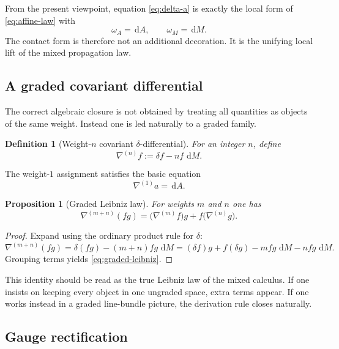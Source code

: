 \documentclass[11pt]{article}
\newtheorem{definition}{Definition}
\newtheorem{proposition}{Proposition}
\newcommand{\dd}{\,\mathrm{d}}
\newcommand{\del}{\delta}
\newcommand{\nab}{\nabla}
\begin{document}
From the present viewpoint, equation \eqref{eq:delta-a} is exactly the local form of \eqref{eq:affine-law} with
\[
\omega_A=\dd A,
\qquad
\omega_M=\dd M.
\]
The contact form is therefore not an additional decoration. It is the unifying local lift of the mixed propagation law.

\subsection{A graded covariant differential}

The correct algebraic closure is not obtained by treating all quantities as objects of the same weight. Instead one is led naturally to a graded family.

\begin{definition}[Weight-$n$ covariant $\delta$-differential]
For an integer $n$, define
\begin{equation}
\label{eq:nabla-n}
\nab^{(n)}f:=\del f-nf\,\dd M.
\end{equation}
\end{definition}

The weight-$1$ assignment satisfies the basic equation
\begin{equation}
\label{eq:weight-one}
\nab^{(1)}a=\dd A.
\end{equation}

\begin{proposition}[Graded Leibniz law]
\label{prop:graded-leibniz}
For weights $m$ and $n$ one has
\begin{equation}
\label{eq:graded-leibniz}
\nab^{(m+n)}(fg)=\bigl(\nab^{(m)}f\bigr)g+f\bigl(\nab^{(n)}g\bigr).
\end{equation}
\end{proposition}

\begin{proof}
Expand using the ordinary product rule for $\del$:
\[
\nab^{(m+n)}(fg)
=\del(fg)-(m+n)fg\,\dd M
=(\del f)g+f(\del g)-mfg\,\dd M-nfg\,\dd M.
\]
Grouping terms yields \eqref{eq:graded-leibniz}.
\end{proof}

This identity should be read as the true Leibniz law of the mixed calculus. If one insists on keeping every object in one ungraded space, extra terms appear. If one works instead in a graded line-bundle picture, the derivation rule closes naturally.

\subsection{Gauge rectification}
\end{document}

